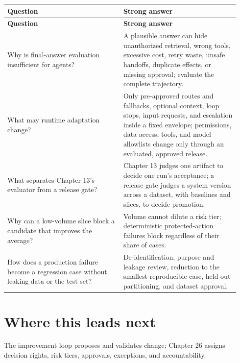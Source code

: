 \BookTableStart
\small
\begin{longtable}{@{}Y{0.4700\linewidth}Y{0.4700\linewidth}@{}}
\color{white}\bfseries \textbf{Question} & \color{white}\bfseries \textbf{Strong answer} \\
\endfirsthead
{}
\color{white}\bfseries \textbf{Question} & \color{white}\bfseries \textbf{Strong answer} \\
\endhead
Why is final-answer evaluation insufficient for agents? & A plausible answer can hide unauthorized retrieval, wrong tools, excessive cost, retry waste, unsafe handoffs, duplicate effects, or missing approval; evaluate the complete trajectory. \\
What may runtime adaptation change? & Only pre-approved routes and fallbacks, optional context, loop stops, input requests, and escalation inside a fixed envelope; permissions, data access, tools, and model allowlists change only through an evaluated, approved release. \\
What separates Chapter 13's evaluator from a release gate? & Chapter 13 judges one artifact to decide one run's acceptance; a release gate judges a system version across a dataset, with baselines and slices, to decide promotion. \\
Why can a low-volume slice block a candidate that improves the average? & Volume cannot dilute a risk tier; deterministic protected-action failures block regardless of their share of cases. \\
How does a production failure become a regression case without leaking data or the test set? & De-identification, purpose and leakage review, reduction to the smallest reproducible case, held-out partitioning, and dataset approval. \\
\end{longtable}
\BookTableEnd

\section{Where this leads next}

The improvement loop proposes and validates change; Chapter 26 assigns decision rights, risk tiers, approvals, exceptions, and accountability.\par


